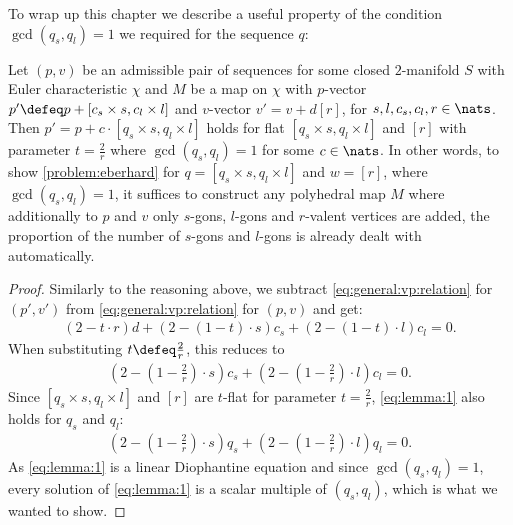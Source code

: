 To wrap up this chapter we describe a useful property of the condition $\gcd(q_s, q_l) = 1$ we required for the sequence $q$:

\begin{lemma}\label{lem:2:valued:eberhard}
  Let $(p, v)$ be an admissible pair of sequences for some closed $2$-manifold $S$ with {\sc Euler} characteristic $\chi$ and $M$ be a map on $\chi$ with $p$-vector $p' \defeq p + [c_s \times s, c_l \times l]$ and $v$-vector $v' = v + d [r]$, for $s, l, c_s, c_l, r \in \nats$. Then $p' = p + c \cdot [q_s \times s, q_l \times l]$ holds for flat $[q_s \times s, q_l \times l]$ and $[r]$ with parameter $t = \tfrac{2}{r}$ where $\gcd(q_s, q_l) = 1$ for some $c \in \nats$. In other words, to show \autoref{problem:eberhard} for $q = [q_s \times s, q_l \times l]$ and $w = [r]$, where $\gcd(q_s, q_l) = 1$, it suffices to construct any polyhedral map $M$ where additionally to $p$ and $v$ only $s$-gons, $l$-gons and $r$-valent vertices are added, the proportion of the number of $s$-gons and $l$-gons is already dealt with automatically.
  \begin{proof}
    Similarly to the reasoning above, we subtract \eqref{eq:general:vp:relation} for $(p', v')$ from \eqref{eq:general:vp:relation} for $(p, v)$ and get:
    \begin{align*}
      (2 - t \cdot r) d + (2 - (1 - t) \cdot s) c_s +  (2 - (1 - t) \cdot l) c_l = 0. 
    \end{align*}
    When substituting $t \defeq \tfrac{2}{r}$, this reduces to
    \begin{align}
      (2 - (1 - \tfrac{2}{r}) \cdot s) c_s + (2 - (1 - \tfrac{2}{r}) \cdot l) c_l = 0. \label{eq:lemma:1}
    \end{align}
    Since $[q_s \times s, q_l \times l]$ and $[r]$ are $t$-flat for parameter $t = \tfrac{2}{r}$, \eqref{eq:lemma:1} also holds for $q_s$ and $q_l$:
    \begin{align}
      (2 - (1 - \tfrac{2}{r}) \cdot s) q_s + (2 - (1 - \tfrac{2}{r}) \cdot l) q_l = 0.
    \end{align}
    As \eqref{eq:lemma:1} is a linear Diophantine equation and since $\gcd(q_s, q_l) = 1$, every solution of \eqref{eq:lemma:1} is a scalar multiple of $(q_s, q_l)$, which is what we wanted to show.
  \end{proof}
\end{lemma}
